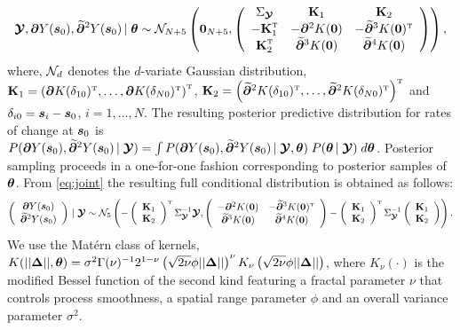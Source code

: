 \begin{equation}\label{eq:joint}
   \Y, \bpartial Y(\bs_0), \widetilde{\bpartial}^2Y(\bs_0)\given \btheta\sim  \N_{N+5}\left(\0_{N+5},\left(\begin{array}{ccc}
         \Sigma_\Y & \bK_1 & \bK_2\\
         -\bK_1^{\T} & -\bpartial^2 K(\0) & -\widetilde{\bpartial}^3K(\0)^{\T}\\
         \bK_2^{\T} & \widetilde{\bpartial}^3K(\0) & \widetilde{\bpartial}^4K(\0)
    \end{array}\right)\right),
\end{equation}
where, $\mathcal{N}_d$ denotes the $d$-variate Gaussian distribution, $\bK_1 = \left(\bpartial K(\delta_{10})^{\T},\ldots,\bpartial K(\delta_{N0})^{\T}\right)^{\T}$, $\bK_2 = \left(\widetilde{\bpartial}^2 K(\delta_{10})^{\T},\ldots,\widetilde{\bpartial}^2 K(\delta_{N0})^{\T}\right)^{\T}$ and $\delta_{i0} =\bs_i-\bs_0$, $i = 1, \ldots, N$. The resulting posterior predictive distribution for rates of change at $\bs_0$ is  $P(\bpartial Y(\bs_0),\widetilde{\bpartial}^2Y(\bs_0)\given \Y) = \int P(\bpartial Y(\bs_0),\widetilde{\bpartial}^2Y(\bs_0)\given \Y,\btheta)\; P(\btheta\given \Y)\;d\btheta$. Posterior sampling proceeds in a one-for-one fashion corresponding to posterior samples of $\btheta$. From \ref{eq:joint} the resulting full conditional distribution is obtained as follows:
\begin{equation}\label{eq:posterior_gradient}
    \left(\begin{array}{c}
         \bpartial Y(\bs_0) \\
         \widetilde{\bpartial}^2Y(\bs_0) 
    \end{array}\right)\given \Y\sim\N_5\left(-\left(\begin{array}{c}
         \bK_1 \\
         \bK_2 
    \end{array}\right)^{\T}\Sigma_\Y^{-1}\Y, \left(\begin{array}{cc}
         -\bpartial^2 K(\0) & -\widetilde{\bpartial}^3K(\0)^{\T} \\
         \widetilde{\bpartial}^3K(\0) & \widetilde{\bpartial}^4K(\0) 
    \end{array}\right)-\left(\begin{array}{c}
         \bK_1 \\
         \bK_2 
    \end{array}\right)^{\T}\Sigma_\Y^{-1}\left(\begin{array}{c}
         \bK_1 \\
         \bK_2 
    \end{array}\right)\right).
\end{equation}
We use the Mat\'ern class of kernels, $K(||\bDelta||,\btheta) = \sigma^2\Gamma(\nu)^{-1}2^{1-\nu}\left(\sqrt{2\nu}\phi||\bDelta||\right)^\nu K_\nu\left(\sqrt{2\nu}\phi||\bDelta||\right)$, where $K_\nu(\cdot)$ is the modified Bessel function of the second kind \cite[][]{abramowitz1988handbook} featuring a fractal parameter $\nu$ that controls process smoothness, a spatial range parameter $\phi$ and an overall variance parameter $\sigma^2$.

